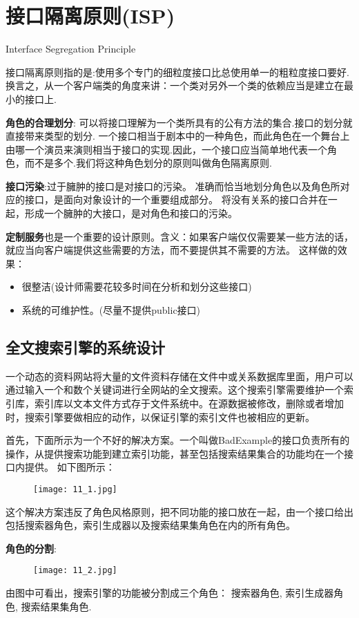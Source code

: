\documentclass[../main.tex]{subfiles}
\begin{document}
\section{接口隔离原则(ISP)}
Interface Segregation Principle

\noindent 接口隔离原则指的是:使用多个专门的细粒度接口比总使用单一的粗粒度接口要好.
换言之，从一个客户端类的角度来讲：一个类对另外一个类的依赖应当是建立在最小的接口上.

\textbf{角色的合理划分}: 可以将接口理解为一个类所具有的公有方法的集合.接口的划分就直接带来类型的划分.
 一个接口相当于剧本中的一种角色，而此角色在一个舞台上由哪一个演员来演则相当于接口的实现.因此，一个接口应当简单地代表一个角色，而不是多个.我们将这种角色划分的原则叫做角色隔离原则.

 \textbf{接口污染}:过于臃肿的接口是对接口的污染。
准确而恰当地划分角色以及角色所对应的接口，是面向对象设计的一个重要组成部分。
将没有关系的接口合并在一起，形成一个臃肿的大接口，是对角色和接口的污染。

\textbf{定制服务}也是一个重要的设计原则。含义：如果客户端仅仅需要某一些方法的话，就应当向客户端提供这些需要的方法，而不要提供其不需要的方法。
这样做的效果：
\begin{itemize}
  \item 很整洁(设计师需要花较多时间在分析和划分这些接口)
  \item 系统的可维护性。(尽量不提供public接口)
\end{itemize}
%
\subsection{全文搜索引擎的系统设计}
一个动态的资料网站将大量的文件资料存储在文件中或关系数据库里面，用户可以通过输入一个和数个关键词进行全网站的全文搜索。这个搜索引擎需要维护一个索引库，索引库以文本文件方式存于文件系统中。在源数据被修改，删除或者增加时，搜索引擎要做相应的动作，以保证引擎的索引文件也被相应的更新。

首先，下面所示为一个不好的解决方案。一个叫做BadExample的接口负责所有的操作，从提供搜索功能到建立索引功能，甚至包括搜索结果集合的功能均在一个接口内提供。
如下图所示：
\begin{figure}[H]
  \texttt{[image: 11\_1.jpg]}
\end{figure}
这个解决方案违反了角色风格原则，把不同功能的接口放在一起，由一个接口给出包括搜索器角色，索引生成器以及搜索结果集角色在内的所有角色。

\textbf{角色的分割}:
\begin{figure}[H]
  \texttt{[image: 11\_2.jpg]}
\end{figure}
由图中可看出，搜索引擎的功能被分割成三个角色：
搜索器角色,
索引生成器角色,
搜索结果集角色.
\end{document}

